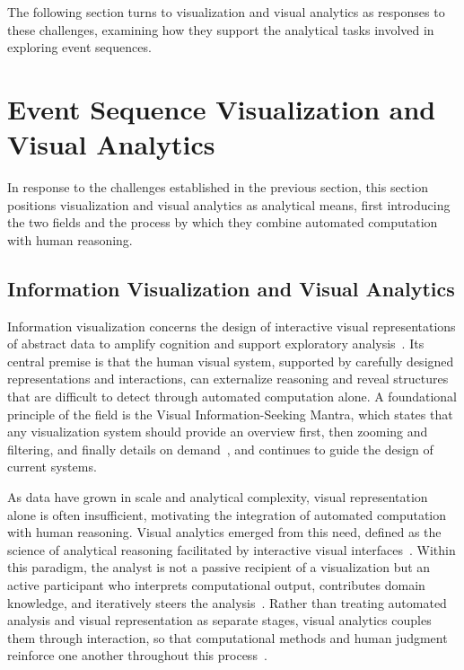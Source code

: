 The following section turns to visualization and visual analytics as responses to these challenges, examining how they support the analytical tasks involved in exploring event sequences.





\section{Event Sequence Visualization and Visual Analytics}

In response to the challenges established in the previous section, this section positions visualization and visual analytics as analytical means, first introducing the two fields and the process by which they combine automated computation with human reasoning. 

\subsection{Information Visualization and Visual Analytics}

Information visualization concerns the design of interactive visual representations of abstract data to amplify cognition and support exploratory analysis~\cite{card1999readings}.
Its central premise is that the human visual system, supported by carefully designed representations and interactions, can externalize reasoning and reveal structures that are difficult to detect through automated computation alone.
A foundational principle of the field is the Visual Information-Seeking Mantra, which states that any visualization system should provide an overview first, then zooming and filtering, and finally details on demand~\cite{shneiderman1996eyes}, and continues to guide the design of current systems.

As data have grown in scale and analytical complexity, visual representation alone is often insufficient, motivating the integration of automated computation with human reasoning.
Visual analytics emerged from this need, defined as the science of analytical reasoning facilitated by interactive visual interfaces~\cite{thomas2005illuminating}.
Within this paradigm, the analyst is not a passive recipient of a visualization but an active participant who interprets computational output, contributes domain knowledge, and iteratively steers the analysis~\cite{keim2008visual}.
Rather than treating automated analysis and visual representation as separate stages, visual analytics couples them through interaction, so that computational methods and human judgment reinforce one another throughout this process~\cite{keim2008visual}.

